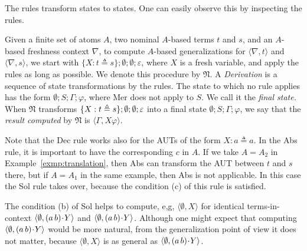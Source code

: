 \documentclass{llncs}
\newcommand{\frN}{\mathfrak N}
\newcommand{\swap}[2]{\ensuremath{(#1\, #2)}}
\newcommand{\permap}{{\mkern 1mu\cdot \mkern 1mu}}
\newcommand{\ids}{\varepsilon}
\newcommand{\np}[2]{\langle #1, \allowbreak #2\rangle}
\newcommand{\Atoms}{A}
\newcommand{\nablai}{{\nabla}}
\newcommand{\nablag}{\Gamma}
\begin{document}
The rules transform states to states. One can easily observe this by inspecting the rules. 

Given a finite set of atoms $\Atoms$, two nominal $\Atoms$-based terms
$ t$ and $ s$, and an $\Atoms$-based freshness context $\nablai$, to
compute $\Atoms$-based generalizations for
$\np{\nablai}{t}$ and $\np{\nablai}{s}$, we start with $\{{ X : t
  \triangleq s}\}; \emptyset; \emptyset; \ids$, where $ X$ is a fresh
variable, and apply the rules as long as possible.  We denote this
procedure by $\frN$. A \emph{Derivation} is a sequence of state transformations by the rules. The state to which no rule applies has the form
$\emptyset; S; \nablag; \varphi$, where \textsf{Mer} does not apply to
$S$. We call it the \emph{final state.} When $\frN$ transforms $\{ X : t
\triangleq\penalty 10000 s\}; \emptyset; \emptyset; \ids$ into a final
state $\emptyset; S; { \nablag;} \varphi$, we say that the
\emph{result computed} by $\frN$ is $\np{\nablag}{X\varphi}$.

Note that the {\sf Dec} rule works also for the AUTs of the form
$X:a\triangleq a$. In the {\sf Abs} rule, it is important to have the
corresponding $c$ in $\Atoms$. If we take $\Atoms=A_2$ in
Example~\ref{exmp:translation}, then {\sf Abs} can transform the AUT
between $t$ and $s$ there, but if $\Atoms=A_1$ in the same example,
then {\sf Abs} is not applicable. In this case the {\sf Sol} rule
takes over, because the condition (c) of this rule is satisfied.

The condition (b) of {\sf Sol} helps to compute, e,g,
$\np{\emptyset}{X}$ for identical terms-in-context
$\np{\emptyset}{\swap{a}{b}\permap Y}$ and $\np{\emptyset}{\swap{a}{b}\permap
  Y}$. Although one might expect that computing
$\np{\emptyset}{\swap{a}{b}\permap Y}$ would be more natural, from the
generalization point of view it does not matter, because
$\np{\emptyset}{X}$ is as general as $\np{\emptyset}{\swap{a}{b}\permap Y}$.
\end{document}
